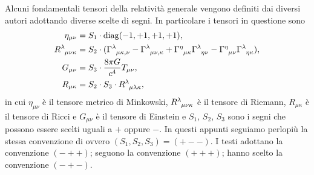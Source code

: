 Alcuni fondamentali tensori della relatività
generale vengono definiti dai diversi autori adottando diverse scelte di segni.
In particolare i tensori in questione sono
\begin{subequations}
  \label{eq:convenzione-segni}
  \begin{align}
    \eta_{\mu\nu} &= S_{1} \cdot \diag(-1,+1,+1,+1), \\
    \tensor{R}{^{\lambda}_{\mu\nu\kappa}} &= S_{2} \cdot
    (\tensor{\Gamma}{^{\lambda}_{\mu\kappa,\nu}} -
    \tensor{\Gamma}{^{\lambda}_{\mu\nu,\kappa}} +
    \tensor{\Gamma}{^{\eta}_{\mu\kappa}} \tensor{\Gamma}{^{\lambda}_{\eta\nu}} -
    \tensor{\Gamma}{^{\eta}_{\mu\nu}}
    \tensor{\Gamma}{^{\lambda}_{\eta\kappa}}), \\
    G_{\mu\nu} &= S_{3} \cdot \frac{8\pi G}{c^{4}} T_{\mu\nu}, \\
    R_{\mu\kappa} &= S_{2} \cdot S_{3} \cdot
    \tensor{R}{^{\lambda}_{\mu\lambda\kappa}},
  \end{align}
\end{subequations}
in cui $\eta_{\mu\nu}$ è il tensore metrico di Minkowski,
$\tensor{R}{^{\lambda}_{\mu\nu\kappa}}$ è il tensore di Riemann, $R_{\mu\kappa}$
è il tensore di Ricci e $G_{\mu\nu}$ è il tensore di Einstein e $S_{1}$,
$S_{2}$, $S_{3}$ sono i segni che possono essere scelti uguali a $+$ oppure $-$.
In questi appunti seguiamo perlopiù la stessa convenzione di
\textcite{weinberg:gravitation} ovvero $(S_{1}, S_{2}, S_{3}) = (+--)$.  I testi
\textcites{barone:relativita,landau:campi} adottano la convenzione $(-++)$;
\textcite{misner:gravitation} seguono la convenzione $(+++)$;
\textcite{ohanian:gravitazione} hanno scelto la convenzione $(-+-)$.


